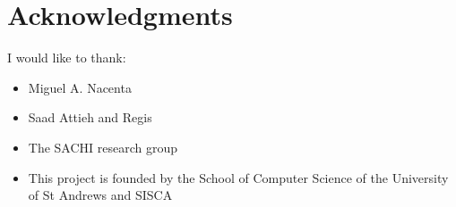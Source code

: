 \section{Acknowledgments}
I would like to thank:
\begin{itemize}
\item Miguel A. Nacenta
\item Saad Attieh and Regis
\item The SACHI research group
\item This project is founded by the School of Computer Science of the University of St Andrews and SISCA
\end{itemize}